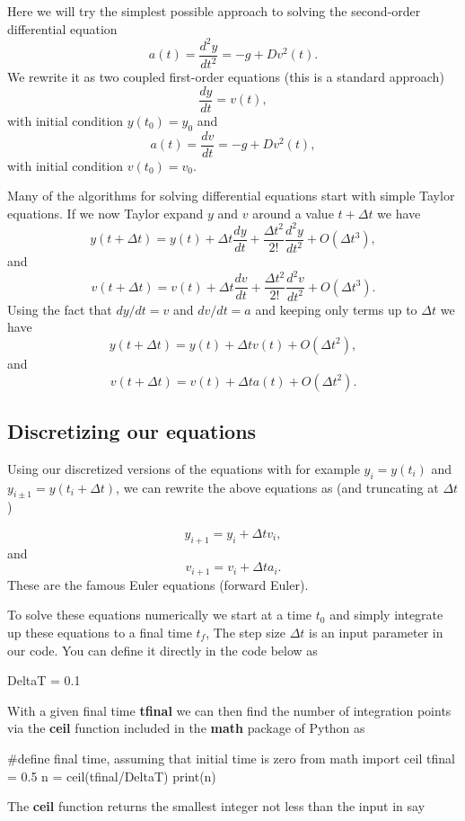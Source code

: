 \documentclass[%
oneside,                 %
final,                   %
10pt]{article}
\begin{document}
Here we will try the simplest possible approach to solving the second-order differential 
equation
\[
a(t) =\frac{d^2y}{dt^2}= -g +Dv^2(t). 
\]
We rewrite it as two coupled first-order equations (this is a standard approach)
\[
\frac{dy}{dt} = v(t),
\]
with initial condition $y(t_0)=y_0$ and 
\[
a(t) =\frac{dv}{dt}= -g +Dv^2(t),
\]
with initial condition $v(t_0)=v_0$.

Many of the algorithms for solving differential equations start with simple Taylor equations.
If we now Taylor expand $y$ and $v$ around a value $t+\Delta t$ we have
\[
y(t+\Delta t) = y(t)+\Delta t \frac{dy}{dt}+\frac{\Delta t^2}{2!} \frac{d^2y}{dt^2}+O(\Delta t^3),
\]
and
\[
v(t+\Delta t) = v(t)+\Delta t \frac{dv}{dt}+\frac{\Delta t^2}{2!} \frac{d^2v}{dt^2}+O(\Delta t^3).
\]
Using the fact that $dy/dt = v$ and $dv/dt=a$ and keeping only terms up to $\Delta t$ we have
\[
y(t+\Delta t) = y(t)+\Delta t v(t)+O(\Delta t^2),
\]
and
\[
v(t+\Delta t) = v(t)+\Delta t a(t)+O(\Delta t^2).
\]

\subsection{Discretizing our equations}

Using our discretized versions of the equations with for example
$y_{i}=y(t_i)$ and $y_{i\pm 1}=y(t_i+\Delta t)$, we can rewrite the
above equations as (and truncating at $\Delta t$)

\[
y_{i+1} = y_i+\Delta t v_i,
\]
and
\[
v_{i+1} = v_i+\Delta t a_i.
\]
These are the famous Euler equations (forward Euler).

To solve these equations numerically we start at a time $t_0$ and simply integrate up these equations to a final time $t_f$,
The step size $\Delta t$ is an input  parameter in our code.
You can define it directly in the code below as


\bpycod
DeltaT = 0.1

\epycod

With a given final time \textbf{tfinal}  we can then find the number of integration points via the \textbf{ceil} function included in the \textbf{math} package of Python
as






\bpycod
#define final time, assuming that initial time is zero
from math import ceil
tfinal = 0.5
n = ceil(tfinal/DeltaT)
print(n)

\epycod

The \textbf{ceil} function returns the smallest integer not less than the input in say
\end{document}
